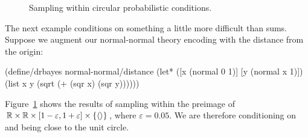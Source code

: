 \begin{figure}[tb!]\centering%
\tab\tab\tab
{}
\caption[Circular probabilistic conditions]{Sampling within circular probabilistic conditions.}%
\label{fig:circular-condition-results}
\end{figure}

The next example conditions on something a little more difficult than sums.
Suppose we augment our normal-normal theory encoding with the distance from the origin:
\begin{center}\singlespacing
\begin{schemedisplay}
(define/drbayes normal-normal/distance
  (let* ([x  (normal 0 1)]
         [y  (normal x 1)])
    (list x y (sqrt (+ (sqr x) (sqr y))))))
\end{schemedisplay}
\end{center}
Figure~\ref{fig:circular-condition-results} shows the results of sampling within the preimage of $\mathbb{R} \times \mathbb{R} \times [1-\varepsilon,1+\varepsilon] \times \{{\langle{}\rangle}\}$, where $\varepsilon = 0.05$.
We are therefore conditioning on  and  being close to the unit circle.

